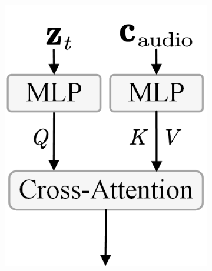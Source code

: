 \begin{figure}[t!]
\begin{minipage}[b]{0.32\textwidth}
\begin{minipage}[b]{\textwidth}
\begin{subfigure}{0.3\linewidth}
                    \includegraphics[width=\linewidth]{figs/AudioCondition/Audio_CA.png}  
                    \caption{}  
                    \label{fig:AudioConditionCA}  
                \end{subfigure}%
                \vspace{-1mm}
                \caption{Different strategies of audio conditioning. (a) self-attention; (b) adaptive norm; (c) cross-attention.}
                \label{fig:AudioCondition}
        \end{minipage}
        \begin{minipage}[b]{\textwidth} %
            \centering
            \begin{subfigure}{0.22\linewidth} %
                \centering

\end{subfigure}
\end{minipage}
\end{minipage}
\end{figure}
